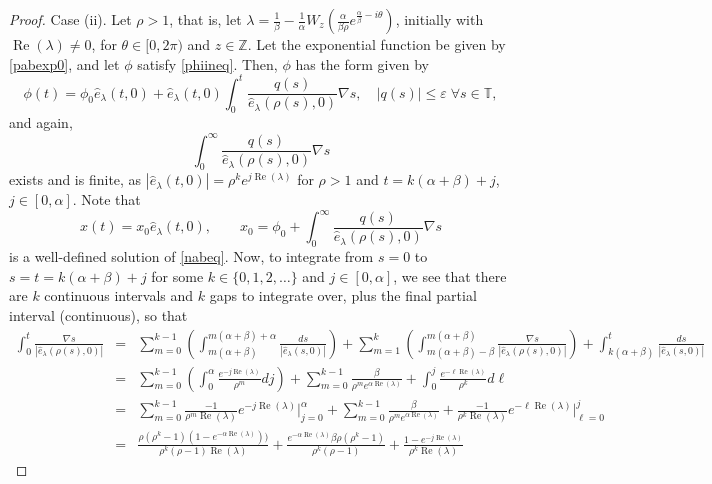 \documentclass[12pt,reqno]{amsart}
\theoremstyle{plain}
\theoremstyle{definition}
\newcommand{\Z}{\ensuremath{\mathbb{Z}}}
\newcommand{\T}{\ensuremath{\mathbb{T}}}
\numberwithin{equation}{section}
\numberwithin{theorem}{section}
\begin{document}
\begin{proof}
Case (ii). Let $\rho>1$, that is, let $\lambda = \frac{1}{\beta}-\frac{1}{\alpha}W_z\left(\frac{\alpha}{\beta \rho}e^{\frac{\alpha}{\beta}-i\theta}\right)$, initially with $\operatorname{Re}(\lambda)\ne 0$, for $\theta\in[0,2\pi)$ and $z\in\Z$. Let the exponential function be given by \eqref{pabexp0}, and let $\phi$ satisfy \eqref{phiineq}. Then, $\phi$ has the form given by 
\begin{equation}\label{phieqform}
 \phi(t)=\phi_0\widehat{e}_{\lambda}(t,0)+\widehat{e}_{\lambda}(t,0) \int_0^t\frac{q(s)}{\widehat{e}_{\lambda}(\rho(s),0)}\nabla s, \quad |q(s)|\le\varepsilon\; \forall s\in\T,  
\end{equation}
and again,
$$ \int_0^{\infty} \frac{q(s)}{\widehat{e}_{\lambda}(\rho(s),0)}\nabla s $$
exists and is finite, as $|\widehat{e}_{\lambda}(t,0)|=\rho^ke^{j\operatorname{Re}(\lambda)}$ for $\rho>1$ and $t=k(\alpha+\beta)+j$, $j\in[0,\alpha]$. Note that 
$$ x(t) = x_0\widehat{e}_{\lambda}(t,0), \qquad x_0=\phi_0 + \int_0^{\infty} \frac{q(s)}{\widehat{e}_{\lambda}(\rho(s),0)}\nabla s $$
is a well-defined solution of \eqref{nabeq}.
Now, to integrate from $s=0$ to $s=t=k(\alpha+\beta)+j$ for some $k\in\{0,1,2,\ldots\}$ and $j\in[0,\alpha]$, we see that there are $k$ continuous intervals and $k$ gaps to integrate over, plus the final partial interval (continuous), so that
\begin{eqnarray}
 \int_{0}^{t} \frac{\nabla s}{|\widehat{e}_{\lambda}(\rho(s),0)|} 
  &=& \sum_{m=0}^{k-1}\left(\int_{m(\alpha+\beta)}^{m(\alpha+\beta)+\alpha}\frac{ds}{|\widehat{e}_{\lambda}(s,0)|}\right)+\sum_{m=1}^{k}\left(\int_{m(\alpha+\beta)-\beta}^{m(\alpha+\beta)}\frac{\nabla s}{|\widehat{e}_{\lambda}(\rho(s),0)|}\right)+\int_{k(\alpha+\beta)}^{t}\frac{ds}{|\widehat{e}_{\lambda}(s,0)|} \nonumber\\
	&=& \sum_{m=0}^{k-1}\left(\int_{0}^{\alpha}\frac{e^{-j\operatorname{Re}(\lambda)}}{\rho^{m}}dj\right)+\sum_{m=0}^{k-1}\frac{\beta}{\rho^me^{\alpha\operatorname{Re}(\lambda)}} +\int_{0}^{j}\frac{e^{-\ell\operatorname{Re}(\lambda)}}{\rho^{k}}d\ell \nonumber\\
	&=& \sum_{m=0}^{k-1}\frac{-1}{\rho^m\operatorname{Re}(\lambda)}e^{-j\operatorname{Re}(\lambda)}\bigg|_{j=0}^{\alpha}+\sum_{m=0}^{k-1}\frac{\beta}{\rho^me^{\alpha\operatorname{Re}(\lambda)}}+\frac{-1}{\rho^k\operatorname{Re}(\lambda)}e^{-\ell\operatorname{Re}(\lambda)}\bigg|_{\ell=0}^{j} \nonumber\\
	&=& \frac{\rho(\rho^k-1)(1-e^{-\alpha\operatorname{Re}(\lambda)}))}{\rho^k(\rho-1)\operatorname{Re}(\lambda)} + \frac{e^{-\alpha\operatorname{Re}(\lambda)}\beta \rho(\rho^k-1)}{\rho^k(\rho-1)} + \frac{1-e^{-j\operatorname{Re}(\lambda)}}{\rho^k\operatorname{Re}(\lambda)} \label{int0tot}

\end{eqnarray}
\end{proof}
\end{document}
